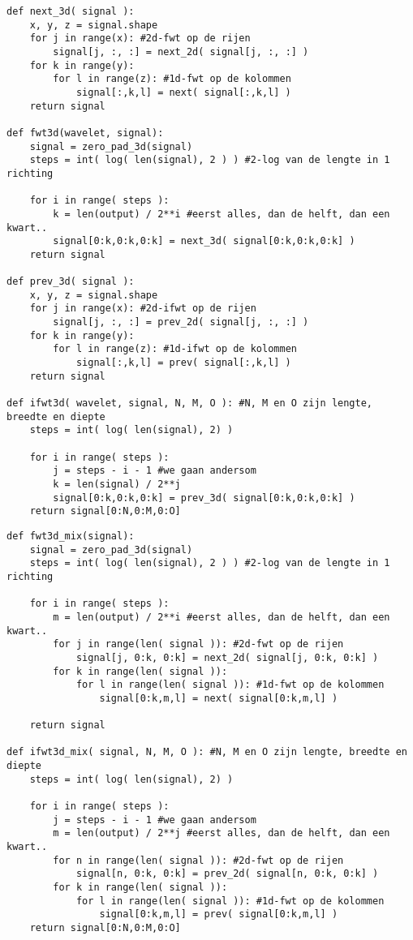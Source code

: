 \begin{lstlisting}[label=mallat3d,float=h!,caption=De Mallatdecompositie in 3 dimensies]
def next_3d( signal ):
	x, y, z = signal.shape
	for j in range(x): #2d-fwt op de rijen
		signal[j, :, :] = next_2d( signal[j, :, :] )
	for k in range(y):
		for l in range(z): #1d-fwt op de kolommen
			signal[:,k,l] = next( signal[:,k,l] )
	return signal

def fwt3d(wavelet, signal):
	signal = zero_pad_3d(signal)
	steps = int( log( len(signal), 2 ) ) #2-log van de lengte in 1 richting
	
	for i in range( steps ):
		k = len(output) / 2**i #eerst alles, dan de helft, dan een kwart..
		signal[0:k,0:k,0:k] = next_3d( signal[0:k,0:k,0:k] )
	return signal

def prev_3d( signal ):
	x, y, z = signal.shape
	for j in range(x): #2d-ifwt op de rijen
		signal[j, :, :] = prev_2d( signal[j, :, :] )
	for k in range(y):
		for l in range(z): #1d-ifwt op de kolommen
			signal[:,k,l] = prev( signal[:,k,l] )
	return signal

def ifwt3d( wavelet, signal, N, M, O ): #N, M en O zijn lengte, breedte en diepte
	steps = int( log( len(signal), 2) )
	
	for i in range( steps ):
		j = steps - i - 1 #we gaan andersom
		k = len(signal) / 2**j
		signal[0:k,0:k,0:k] = prev_3d( signal[0:k,0:k,0:k] )
	return signal[0:N,0:M,0:O]
\end{lstlisting}

\begin{lstlisting}[label=mengertje,float=h!,caption=De mengvorm in 3 dimensies]
def fwt3d_mix(signal):
	signal = zero_pad_3d(signal)
	steps = int( log( len(signal), 2 ) ) #2-log van de lengte in 1 richting
	
	for i in range( steps ):
		m = len(output) / 2**i #eerst alles, dan de helft, dan een kwart..
		for j in range(len( signal )): #2d-fwt op de rijen
			signal[j, 0:k, 0:k] = next_2d( signal[j, 0:k, 0:k] )
		for k in range(len( signal )):
			for l in range(len( signal )): #1d-fwt op de kolommen
				signal[0:k,m,l] = next( signal[0:k,m,l] )

	return signal

def ifwt3d_mix( signal, N, M, O ): #N, M en O zijn lengte, breedte en diepte
	steps = int( log( len(signal), 2) )
	
	for i in range( steps ):
		j = steps - i - 1 #we gaan andersom
		m = len(output) / 2**j #eerst alles, dan de helft, dan een kwart..
		for n in range(len( signal )): #2d-fwt op de rijen
			signal[n, 0:k, 0:k] = prev_2d( signal[n, 0:k, 0:k] )
		for k in range(len( signal )):
			for l in range(len( signal )): #1d-fwt op de kolommen
				signal[0:k,m,l] = prev( signal[0:k,m,l] )
	return signal[0:N,0:M,0:O]
\end{lstlisting}
